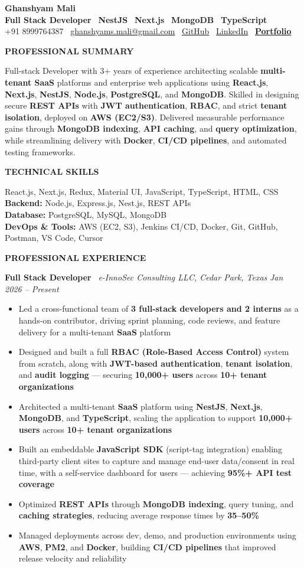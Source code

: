 \documentclass[a4paper,10pt]{article}
\makeatletter
\newcommand{\resumeskipsection}{\vspace{7pt}}
\newcommand{\resumeskipentry}{\vspace{5pt}}
\newcommand{\resumeskipafterheader}{\vspace{3pt}}
\newcommand{\resumename}{\fontsize{20pt}{24pt}\selectfont\bfseries\color{primary}}
\newcommand{\resumecontact}{\fontsize{9.5pt}{12pt}\selectfont\color{bodytext}}
\newcommand{\resumebody}{\fontsize{10pt}{13.5pt}\selectfont\color{bodytext}}
\newcommand{\resumejobtitle}{\fontsize{10pt}{12pt}\selectfont\bfseries\color{primary}}
\newcommand{\resumejobmeta}{\fontsize{10pt}{12pt}\selectfont\itshape\color{bodytext}}
\newcommand{\resumedate}{\fontsize{10pt}{12pt}\selectfont\itshape\color{bodytext}}
\newcommand{\resumeskilllabel}{\fontsize{10pt}{13.5pt}\selectfont\bfseries\color{primary}}
\newcommand{\kw}[1]{\textbf{\color{primary}#1}}
\newcommand{\metric}[1]{\textbf{\color{accent}#1}}
\newcommand{\demolink}[2]{\href{#1}{\textcolor{accent}{\textbf{#2}}}}
\newcommand{\sectionheader}[1]{%
    \resumeskipsection
    \noindent
    \colorbox{primary}{%
        \parbox{\dimexpr\linewidth-2\fboxsep}{%
            \vspace{2pt}%
            {\resumesection #1}%
            \vspace{2pt}%
        }%
    }%
    \resumeskipafterheader
}
\newcommand{\resumesection}{\fontsize{11pt}{13pt}\selectfont\bfseries\color{white}}
\newcommand{\headerbox}{%
    \noindent
    \colorbox{lightbg}{%
        \parbox{\dimexpr\linewidth-2\fboxsep}{%
            \vspace{6pt}%
            \centering
            {\resumename Ghanshyam Mali}\\[3pt]
            {\fontsize{10.5pt}{13pt}\selectfont \kw{Full Stack Developer} \textbar\ \kw{NestJS} \textbar\ \kw{Next.js} \textbar\ \kw{MongoDB} \textbar\ \kw{TypeScript}}\\[4pt]
            {\resumecontact
                +91 8999764387 \textbar\
                \href{mailto:ghanshyams.mali@gmail.com}{ghanshyams.mali@gmail.com} \textbar\
                \href{https://github.com/maliGhanshyam}{GitHub} \textbar\
                \href{https://linkedin.com/in/ghanshyammali}{LinkedIn} \textbar\
                \demolink{https://gm-portfolio-rp85.onrender.com}{Portfolio}%
            }%
            \vspace{6pt}%
        }%
    }%
    \vspace{2pt}%
    \noindent{\color{accent}\rule{0.22\linewidth}{1.2pt}\color{softrule}\rule{0.78\linewidth}{0.6pt}}%
}
\newcommand{\jobentry}[4]{%
    \noindent
    {\resumejobtitle #1} \textbar\ {\resumejobmeta #2} \hfill {\resumedate #3}%
    \begin{itemize}
        #4
    \end{itemize}%
    \resumeskipentry
}
\makeatother
\begin{document}
\resumebody

\headerbox

\sectionheader{PROFESSIONAL SUMMARY}
\noindent Full-stack Developer with 3+ years of experience architecting scalable \kw{multi-tenant SaaS} platforms and enterprise web applications using \kw{React.js}, \kw{Next.js}, \kw{NestJS}, \kw{Node.js}, \kw{PostgreSQL}, and \kw{MongoDB}. Skilled in designing secure \kw{REST APIs} with \kw{JWT authentication}, \kw{RBAC}, and strict \kw{tenant isolation}, deployed on \kw{AWS (EC2/S3)}. Delivered measurable performance gains through \kw{MongoDB indexing}, \kw{API caching}, and \kw{query optimization}, while streamlining delivery with \kw{Docker}, \kw{CI/CD pipelines}, and automated testing frameworks.

\sectionheader{TECHNICAL SKILLS}
\noindent{\resumeskilllabel Frontend:} React.js, Next.js, Redux, Material UI, JavaScript, TypeScript, HTML, CSS\\[2pt]
{\resumeskilllabel Backend:} Node.js, Express.js, Nest.js, REST APIs\\[2pt]
{\resumeskilllabel Database:} PostgreSQL, MySQL, MongoDB\\[2pt]
{\resumeskilllabel DevOps \& Tools:} AWS (EC2, S3), Jenkins CI/CD, Docker, Git, GitHub, Postman, VS Code, Cursor

\sectionheader{PROFESSIONAL EXPERIENCE}

\jobentry{Full Stack Developer}{e-InnoSec Consulting LLC, Cedar Park, Texas}{Jan 2026 -- Present}{%
    \item Led a cross-functional team of \metric{3 full-stack developers and 2 interns} as a hands-on contributor, driving sprint planning, code reviews, and feature delivery for a multi-tenant \kw{SaaS} platform
    \item Designed and built a full \kw{RBAC (Role-Based Access Control)} system from scratch, along with \kw{JWT-based authentication}, \kw{tenant isolation}, and \kw{audit logging} --- securing \metric{10,000+ users} across \metric{10+ tenant organizations}
    \item Architected a multi-tenant \kw{SaaS} platform using \kw{NestJS}, \kw{Next.js}, \kw{MongoDB}, and \kw{TypeScript}, scaling the application to support \metric{10,000+ users} across \metric{10+ tenant organizations}
    \item Built an embeddable \kw{JavaScript SDK} (script-tag integration) enabling third-party client sites to capture and manage end-user data/consent in real time, with a self-service dashboard for users --- achieving \metric{95\%+ API test coverage}
    \item Optimized \kw{REST APIs} through \kw{MongoDB indexing}, query tuning, and \kw{caching strategies}, reducing average response times by \metric{35--50\%}
    \item Managed deployments across dev, demo, and production environments using \kw{AWS}, \kw{PM2}, and \kw{Docker}, building \kw{CI/CD pipelines} that improved release velocity and reliability
}
\end{document}
